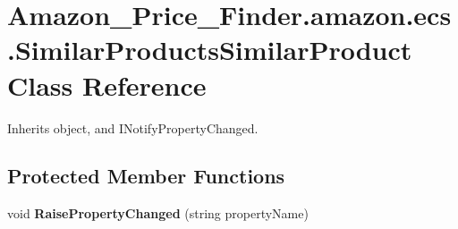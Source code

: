 \hypertarget{class_amazon___price___finder_1_1amazon_1_1ecs_1_1_similar_products_similar_product}{\section{Amazon\-\_\-\-Price\-\_\-\-Finder.\-amazon.\-ecs.\-Similar\-Products\-Similar\-Product Class Reference}
\label{class_amazon___price___finder_1_1amazon_1_1ecs_1_1_similar_products_similar_product}
}


 




Inherits object, and I\-Notify\-Property\-Changed.

\subsection*{Protected Member Functions}
\begin{DoxyCompactItemize}
\item 
\hypertarget{class_amazon___price___finder_1_1amazon_1_1ecs_1_1_similar_products_similar_product_a84cb034edcb8aa2a28f6cf198f562310}{void {\bfseries Raise\-Property\-Changed} (string property\-Name)}\label{class_amazon___price___finder_1_1amazon_1_1ecs_1_1_similar_products_similar_product_a84cb034edcb8aa2a28f6cf198f562310}

\end{DoxyCompactItemize}
